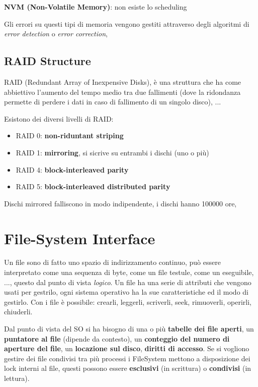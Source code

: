\documentclass[12pt]{article}
\begin{document}
\textbf{NVM (Non-Volatile Memory)}: non esiste lo scheduling

Gli errori su questi tipi di memoria vengono gestiti attraverso degli algoritmi di \emph{error detection} o \emph{error correction},  


\subsection{RAID Structure} 
RAID (Redundant Array of Inexpensive Disks), \`e una struttura che ha come abbiettivo l'aumento del tempo medio tra due fallimenti (dove la ridondanza permette di perdere i dati in caso di fallimento di un singolo disco), ...

Esistono dei diversi livelli di RAID:
\begin{itemize}
  \item RAID 0: \textbf{non-riduntant striping}
  \item RAID 1: \textbf{mirroring}, si sicrive su entrambi i dischi (uno o pi\`u)
  \item RAID 4: \textbf{block-interleaved parity}
  \item RAID 5: \textbf{block-interleaved distributed parity}
\end{itemize}

\begin{example}{}{}
  Dischi mirrored falliscono in modo indipendente, i dischi hanno 100000 ore, 
\end{example}



\section{File-System Interface}
Un file sono di fatto uno spazio di indirizzamento continuo, pu\`o essere interpretato come una sequenza di byte, come un file testule, come un eseguibile, ..., questo dal punto di vista \emph{logico}. Un file ha una serie di attributi che vengono usati per gestrilo, ogni sistema operativo ha la sue caratteristiche ed il modo di gestirlo. Con i file \`e possibile: crearli, leggerli, scriverli, seek, rimuoverli, operirli, chiuderli.

Dal punto di vista del SO si ha bisogno di una o pi\`u \textbf{tabelle dei file aperti}, un \textbf{puntatore al file} (dipende da contesto), un \textbf{conteggio del numero di aperture del file}, un \textbf{locazione sul disco}, \textbf{diritti di accesso}. Se si vogliono gestire dei file condivisi tra pi\`u processi i FileSystem mettono a disposizione dei lock interni al file, questi possono essere \textbf{esclusivi} (in scrittura) o \textbf{condivisi} (in lettura).
\end{document}
